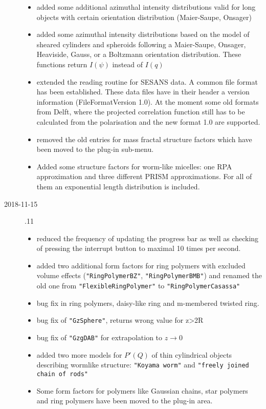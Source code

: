 \begin{description}
\begin{itemize}
     \item added some additional azimuthal intensity distributions valid for long objects with certain orientation distribution (Maier-Saupe, Onsager)
     \item added some azimuthal intensity distributions based on the model of sheared cylinders and spheroids following a Maier-Saupe, Onsager, Heaviside, Gauss, or a Boltzmann orientation distribution. These functions return $I(\psi)$ instead of $I(q)$
     \item extended the reading routine for SESANS data. A common file format has been established. These data files have in their header a version information (FileFormatVersion 1.0). At the moment some old formats from Delft, where the projected correlation function still has to be calculated from the polarisation and the new format 1.0 are supported.
    \item  removed the old entries for mass fractal structure factors which have been moved to the plug-in sub-menu.
    \item Added some structure factors for worm-like micelles: one RPA approximation and three different PRISM approximations. For all of them an exponential length distribution is included.
    \end{itemize}
\item[2018-11-15] .11
    \begin{itemize}
    \item reduced the frequency of updating the progress bar as well as checking of pressing the interrupt button to maximal 10 times per second.
    \item added two additional form factors for ring polymers with excluded volume effects (\texttt{"RingPolymerBZ"}, \texttt{"RingPolymerBMB"}) and renamed the old one from \texttt{"FlexibleRingPolymer"} to \texttt{"RingPolymerCasassa"}
    \item bug fix in ring polymers, daisy-like ring and m-membered twisted ring.
    \item bug fix of \texttt{"GzSphere"}, returns wrong value for z>2R
    \item bug fix of \texttt{"GzgDAB"} for extrapolation to $z\rightarrow 0$
    \item added two more models for $P'(Q)$ of thin cylindrical objects describing wormlike structure: \texttt{"Koyama worm"} and \texttt{"freely joined chain of rods"}
    \item Some form factors for polymers like Gaussian chains, star polymers and ring polymers have been moved to the plug-in area.

\end{itemize}
\end{description}
